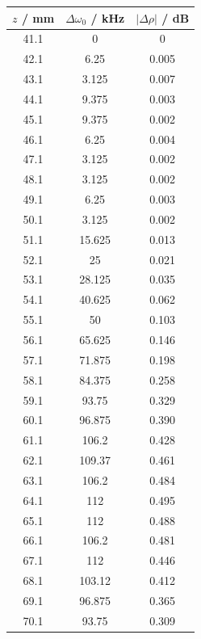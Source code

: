 \documentclass[a4paper]{report}
\numberwithin{equation}{section}
\begin{document}
\begin{table}[!ht]
    \centering
    \begin{tabular}{|c|c|c|}
    \hline
        $z$ / mm & $\Delta\omega_0$ / kHz & $|\Delta\rho|$ / dB \\ \hline
        41.1 & 0 & 0 \\ \hline
        42.1 & 6.25 & 0.005 \\ \hline
        43.1 & 3.125 & 0.007 \\ \hline
        44.1 & 9.375 & 0.003 \\ \hline
        45.1 & 9.375 & 0.002 \\ \hline
        46.1 & 6.25 & 0.004 \\ \hline
        47.1 & 3.125 & 0.002 \\ \hline
        48.1 & 3.125 & 0.002 \\ \hline
        49.1 & 6.25 & 0.003 \\ \hline
        50.1 & 3.125 & 0.002 \\ \hline
        51.1 & 15.625 & 0.013 \\ \hline
        52.1 & 25 & 0.021 \\ \hline
        53.1 & 28.125 & 0.035 \\ \hline
        54.1 & 40.625 & 0.062 \\ \hline
        55.1 & 50 & 0.103 \\ \hline
        56.1 & 65.625 & 0.146 \\ \hline
        57.1 & 71.875 & 0.198 \\ \hline
        58.1 & 84.375 & 0.258 \\ \hline
        59.1 & 93.75 & 0.329 \\ \hline
        60.1 & 96.875 & 0.390 \\ \hline
        61.1 & 106.2 & 0.428 \\ \hline
        62.1 & 109.37 & 0.461 \\ \hline
        63.1 & 106.2 & 0.484 \\ \hline
        64.1 & 112 & 0.495 \\ \hline
        65.1 & 112 & 0.488 \\ \hline
        66.1 & 106.2 & 0.481 \\ \hline
        67.1 & 112 & 0.446 \\ \hline
        68.1 & 103.12 & 0.412 \\ \hline
        69.1 & 96.875 & 0.365 \\ \hline
        70.1 & 93.75 & 0.309 \\ \hline

\end{tabular}
\end{table}
\end{document}
